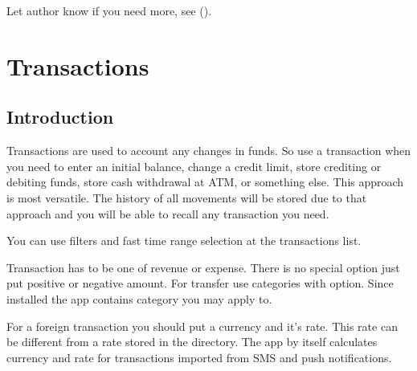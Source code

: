 \documentclass[a4paper,10pt,english]{sphinxmanual}
\begin{document}
Let author know if you need more, see {\hyperref[\detokenize{preface:section-feedback}]{}} ().


\chapter{Transactions}
\label{\detokenize{transactions:transactions}}\label{\detokenize{transactions:chapter-transactions}}\label{\detokenize{transactions::doc}}

\section{Introduction}
\label{\detokenize{transactions:introduction}}
Transactions are used to account any changes in funds. So use a transaction when you need to
enter an initial balance, change a credit limit, store crediting or debiting funds,
store cash withdrawal at ATM, or something else. This approach is most versatile. The history of
all movements will be stored due to that approach and you will be able to recall any transaction
you need.

\noindent{}

\noindent{}

\noindent{}

You can use filters and fast time range selection at the transactions list.

\noindent{}

\noindent{}

\noindent{}

Transaction has to be one of revenue or expense. There is no special option just put positive
or negative amount. For transfer use categories with  option.
Since installed the app contains  category you may apply to.

For a foreign transaction you should put a currency and it’s rate. This rate can be different from
a rate stored in the  directory. The app by itself calculates currency and rate
for transactions imported from SMS and push notifications.
\end{document}
